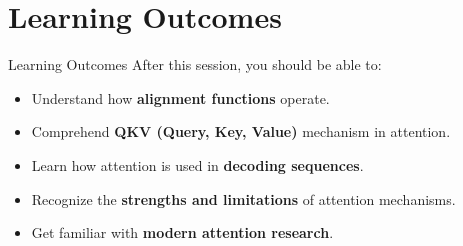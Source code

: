 \section{Learning Outcomes}
\begin{frame}{Learning Outcomes}
    After this session, you should be able to:
    \begin{itemize}
        \item Understand how \textbf{alignment functions} operate.
        \item Comprehend \textbf{QKV (Query, Key, Value)} mechanism in attention.
        \item Learn how attention is used in \textbf{decoding sequences}.
        \item Recognize the \textbf{strengths and limitations} of attention mechanisms.
        \item Get familiar with \textbf{modern attention research}.
    \end{itemize}
\end{frame}
